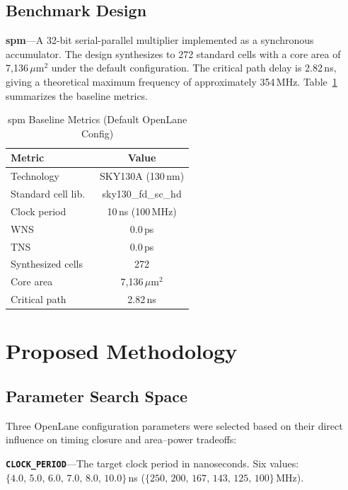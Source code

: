 \documentclass[conference]{IEEEtran}
\begin{document}
\subsection{Benchmark Design}

\textbf{spm}---A 32-bit serial-parallel multiplier implemented as a
synchronous accumulator. The design synthesizes to 272 standard cells
with a core area of 7{,}136\,$\mu$m$^2$ under the default
configuration. The critical path delay is 2.82\,ns, giving a
theoretical maximum frequency of approximately 354\,MHz.
Table~\ref{tab:baseline} summarizes the baseline metrics.

\begin{table}[!t]
  \caption{spm Baseline Metrics (Default OpenLane Config)}
  \label{tab:baseline}
  \centering
  \renewcommand{\arraystretch}{1.15}
  \begin{tabular}{lc}
    \toprule
    \textbf{Metric} & \textbf{Value} \\
    \midrule
    Technology       & SKY130A (130\,nm) \\
    Standard cell lib.\ & sky130\_fd\_sc\_hd \\
    Clock period     & 10\,ns (100\,MHz) \\
    WNS              & 0.0\,ps \\
    TNS              & 0.0\,ps \\
    Synthesized cells & 272 \\
    Core area        & 7{,}136\,$\mu$m$^2$ \\
    Critical path    & 2.82\,ns \\
    \bottomrule
  \end{tabular}
\end{table}

\section{Proposed Methodology}

\subsection{Parameter Search Space}

Three OpenLane configuration parameters were selected based on their
direct influence on timing closure and area--power tradeoffs:

\textbf{\texttt{CLOCK\_PERIOD}}---The target clock period in
nanoseconds. Six values: $\{4.0,\,5.0,\,6.0,\,7.0,\,8.0,\,10.0\}$\,ns
($\{250,\,200,\,167,\,143,\,125,\,100\}$\,MHz).
\end{document}
